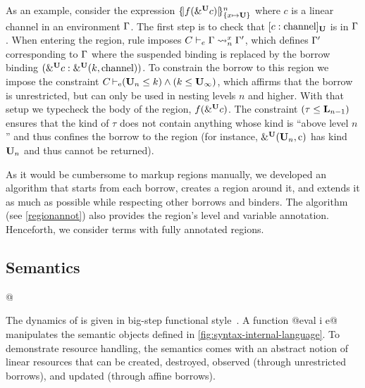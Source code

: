 As an example, consider the expression $\region{\Sone x\IBORROW}{f(\borrow[\IBORROW]{c})}$
where $c$ is a linear channel in an environment $\E$.
The first step is to check that $\svar[\IBORROW]{c}{\text{channel}}$
is in $\E$.
When entering the region, rule  imposes
$\lregion{C}{x}{\E}{\E'}$, which defines $\E'$
corresponding to $\E$ where the suspended binding is replaced by the
borrow binding  $\bvar{\borrow[\IBORROW]{c}}{\borrowty[\IBORROW]{k}{\text{channel}}}$.
To constrain the borrow to this region we impose the constraint
$\entail{C}{(\kun_n\lk k) \wedge (k \lk\kun_\infty)}$, which affirms
that the borrow is unrestricted, but can only be used in nesting
levels $n$ and higher.
With that setup we typecheck the body of the region,
$f(\borrow[\IBORROW]{c})$.
The constraint $\Cleq{\tau}{\klin_{n-1}}$ ensures
that the kind of $\tau$ does not contain anything whose kind is
``above level $n$'' and thus confines the borrow to the region
(for instance, $\borrowty[\IBORROW]{\kun_n}{\text{c}}$ has kind
$\kun_n$ and thus cannot be returned).


As it would be cumbersome to markup regions manually, we developed an
algorithm that starts from each borrow, creates a region around it,
and extends it as much as possible while respecting other borrows
and binders. The algorithm (see \cref{regionannot}) also provides the region's level
and variable annotation.
Henceforth, we consider terms with fully annotated regions.







\subsection{Semantics}
\label{sec:sem}


\lstMakeShortInline[style=rule,basicstyle=\normalsize\normalfont]@

The dynamics of \lang is given in big-step
functional
style~\cite{siek13:_type_safet_three_easy_lemmas,DBLP:conf/esop/OwensMKT16,
  DBLP:conf/popl/AminR17}.  A function
@eval \Store \Perm \VEnv i e@
manipulates the semantic objects defined in
\cref{fig:syntax-internal-language}.
To demonstrate resource handling, the semantics comes with an abstract
notion of linear resources that can be created, destroyed, observed
(through unrestricted borrows), and
updated (through affine borrows).

